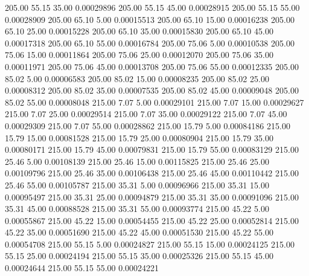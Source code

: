     205.00     55.15     35.00     0.00029896
    205.00     55.15     45.00     0.00028915
    205.00     55.15     55.00     0.00028909
    205.00     65.10      5.00     0.00015513
    205.00     65.10     15.00     0.00016238
    205.00     65.10     25.00     0.00015228
    205.00     65.10     35.00     0.00015830
    205.00     65.10     45.00     0.00017318
    205.00     65.10     55.00     0.00016784
    205.00     75.06      5.00     0.00010538
    205.00     75.06     15.00     0.00011864
    205.00     75.06     25.00     0.00012070
    205.00     75.06     35.00     0.00011971
    205.00     75.06     45.00     0.00013708
    205.00     75.06     55.00     0.00012335
    205.00     85.02      5.00     0.00006583
    205.00     85.02     15.00     0.00008235
    205.00     85.02     25.00     0.00008312
    205.00     85.02     35.00     0.00007535
    205.00     85.02     45.00     0.00009048
    205.00     85.02     55.00     0.00008048
    215.00      7.07      5.00     0.00029101
    215.00      7.07     15.00     0.00029627
    215.00      7.07     25.00     0.00029514
    215.00      7.07     35.00     0.00029122
    215.00      7.07     45.00     0.00029309
    215.00      7.07     55.00     0.00028862
    215.00     15.79      5.00     0.00084186
    215.00     15.79     15.00     0.00081528
    215.00     15.79     25.00     0.00080904
    215.00     15.79     35.00     0.00080171
    215.00     15.79     45.00     0.00079831
    215.00     15.79     55.00     0.00083129
    215.00     25.46      5.00     0.00108139
    215.00     25.46     15.00     0.00115825
    215.00     25.46     25.00     0.00109796
    215.00     25.46     35.00     0.00106438
    215.00     25.46     45.00     0.00110442
    215.00     25.46     55.00     0.00105787
    215.00     35.31      5.00     0.00096966
    215.00     35.31     15.00     0.00095497
    215.00     35.31     25.00     0.00094879
    215.00     35.31     35.00     0.00091096
    215.00     35.31     45.00     0.00088528
    215.00     35.31     55.00     0.00093774
    215.00     45.22      5.00     0.00055867
    215.00     45.22     15.00     0.00054455
    215.00     45.22     25.00     0.00052814
    215.00     45.22     35.00     0.00051690
    215.00     45.22     45.00     0.00051530
    215.00     45.22     55.00     0.00054708
    215.00     55.15      5.00     0.00024827
    215.00     55.15     15.00     0.00024125
    215.00     55.15     25.00     0.00024194
    215.00     55.15     35.00     0.00025326
    215.00     55.15     45.00     0.00024644
    215.00     55.15     55.00     0.00024221
